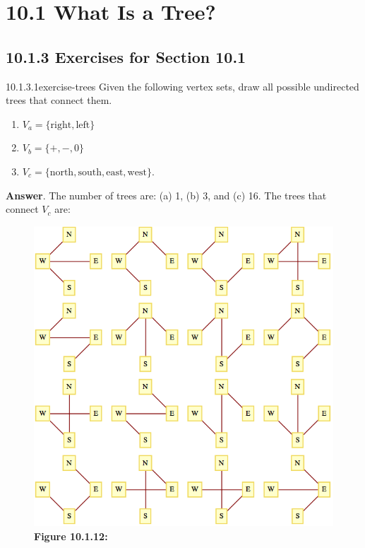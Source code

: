 \documentclass[twoside,10pt,]{book}
\numberwithin{equation}{section}
\begin{document}
\section*{10.1 What Is a Tree?}
\subsection*{10.1.3 Exercises for Section 10.1}
\begin{divisionsolution}{10.1.3.1}{}{exercise-trees}%
\hypertarget{p-3543}{}%
Given the following vertex sets, draw all possible undirected trees that connect them.%
\par
\hypertarget{p-3544}{}%
\leavevmode%
\begin{enumerate}[label=(\alph*)]
\item\hypertarget{li-1641}{}\hypertarget{p-3545}{}%
\(V_a= \{\text{right},\text{left}\}\)%
\item\hypertarget{li-1642}{}\hypertarget{p-3546}{}%
\(V_b = \{+,-,0\}\)%
\item\hypertarget{li-1643}{}\hypertarget{p-3547}{}%
\(V_c = \{\text{north}, \text{south}, \text{east}, \text{west}\}\).%
\end{enumerate}
%
\par\smallskip%
\noindent\textbf{Answer}.\quad%
\hypertarget{p-3548}{}%
The number of trees are: (a) 1, (b) 3, and (c) 16.  The trees that connect \(V_c\) are:%
\begin{figure}
\centering
\includegraphics[width=1\linewidth]{images/fig-sol-10-1-1.png}
\caption*{\textbf{Figure 10.1.12:} }
\end{figure}
\end{divisionsolution}%
\end{document}
